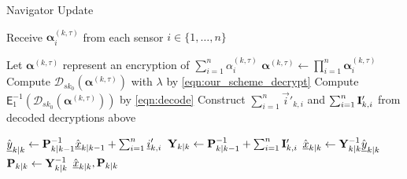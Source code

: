 \begin{algorithm}[htbp]
\caption{Navigator Update}\label{alg:nav_update}
\begin{algorithmic}[1]
    
        \State Receive $\bm{\alpha}_{i}^{(k,\tau)}$ from each sensor $i\in\{1,\dots,n\}$
    \EndFor

    \State Let $\bm{\alpha}^{(k,\tau)}$ represent an encryption of $\sum_{i=1}^n\alpha_{i}^{(k,\tau)}$
        \State $\bm{\alpha}^{(k,\tau)} \gets \prod_{i=1}^n\bm{\alpha}_{i}^{(k,\tau)}$
        \State Compute $\mathcal{D}_{sk_0}(\bm{\alpha}^{(k,\tau)})$ with $\lambda$ by \eqref{eqn:our_scheme_decrypt}
        \State Compute $\mathsf{E}^{-1}_{1}(\mathcal{D}_{sk_0}(\bm{\alpha}^{(k,\tau)}))$ by \eqref{eqn:decode}
    \EndFor
    \State Construct $\sum_{i=1}^n\vec{i}'_{k,i}$ and $\sum_{i=1}^n{{\mathbf{I}}}'_{k,i}$ from decoded decryptions above

    \State $\hat{{\underline{y}}}_{k|k} \gets {\ensuremath{{\mathbf{P}}}}_{k|k-1}^{-1}\hat{{\underline{x}}}_{k|k-1} + \sum_{i=1}^n{\underline{i}}'_{k,i}$
    \State ${{\mathbf{Y}}}_{k|k} \gets {\ensuremath{{\mathbf{P}}}}_{k|k-1}^{-1} + \sum_{i=1}^n{{\mathbf{I}}}'_{k,i}$
    \State $\hat{{\underline{x}}}_{k|k} \gets {\ensuremath{{\mathbf{Y}}}}_{k|k}^{-1}\hat{{\underline{y}}}_{k|k}$
    \State ${{\mathbf{P}}}_{k|k} \gets {\ensuremath{{\mathbf{Y}}}}_{k|k}^{-1}$
    \State \Return $\hat{{\underline{x}}}_{k|k}, {{\mathbf{P}}}_{k|k}$
    \EndProcedure
\end{algorithmic}
\end{algorithm}

